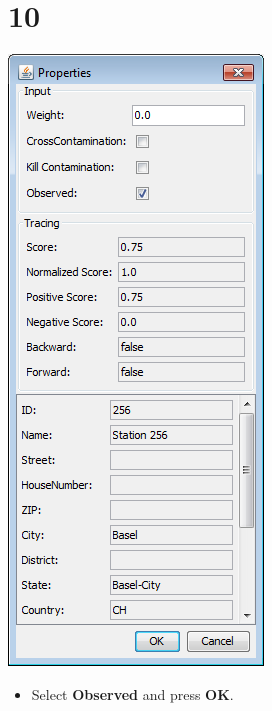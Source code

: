 \documentclass{beamer}
\begin{document}
\section{10}
\begin{frame}
	\begin{center}
  		\includegraphics[height=0.6\textheight]{10.png}
	\end{center}
	\begin{itemize}
		\item Select \textbf{Observed} and press \textbf{OK}.
	\end{itemize}
\end{frame}
\end{document}
